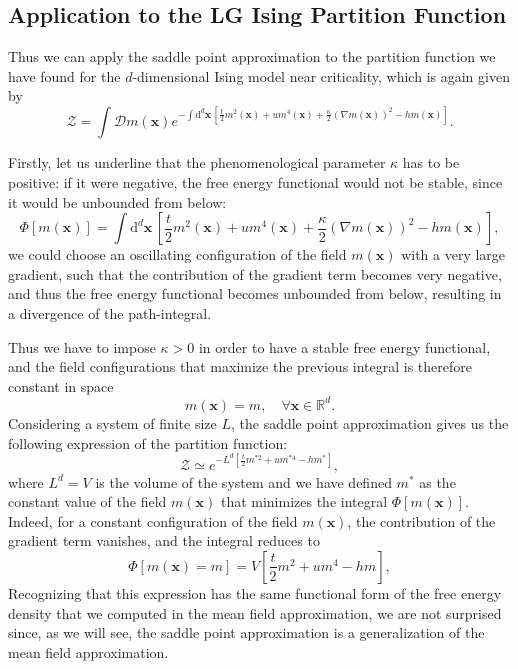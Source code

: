 \subsection{Application to the LG Ising Partition Function}

Thus we can apply the saddle point approximation to the partition function we have found for the \(d\)-dimensional Ising model near criticality, which is again given by
\[
    \mathcal{Z} = \int \mathcal{D} m(\mathbf{x}) e^{-\int \mathrm{d}^d \mathbf{x}\, \left[ \frac{t}{2} m^2(\mathbf{x}) + u m^4(\mathbf{x}) + \frac{\kappa}{2} (\nabla m(\mathbf{x}))^2 - h m(\mathbf{x})\right]}.
\]

Firstly, let us underline that the phenomenological parameter \(\kappa\) has to be positive: if it were negative, the free energy functional would not be stable, since it would be unbounded from below:
\[
    \Phi[m(\mathbf{x})] = \int \mathrm{d}^d \mathbf{x}\, \left[ \frac{t}{2} m^2(\mathbf{x}) + u m^4(\mathbf{x}) + \frac{\kappa}{2} (\nabla m(\mathbf{x}))^2 - h m(\mathbf{x})\right],
\]
we could choose an oscillating configuration of the field \(m(\mathbf{x})\) with a very large gradient, such that the contribution of the gradient term becomes very negative, and thus the free energy functional becomes unbounded from below, resulting in a divergence of the path-integral.

Thus we have to impose \(\kappa > 0\) in order to have a stable free energy functional, and the field configurations that maximize the previous integral is therefore constant in space
\[
    m(\mathbf{x}) = m, \quad \forall \mathbf{x} \in \mathbb{R}^d.
\]
Considering a system of finite size \(L\), the saddle point approximation gives us the following expression of the partition function:
\[
    \mathcal{Z} \simeq e^{-L^d \left[ \frac{t}{2} m^{*2} + u m^{*4} - h m^*\right]},
\]
where \(L^d = V\) is the volume of the system and we have defined \(m^*\) as the constant value of the field \(m(\mathbf{x})\) that minimizes the integral \(\Phi[m(\mathbf{x})]\).
Indeed, for a constant configuration of the field \(m(\mathbf{x})\), the contribution of the gradient term vanishes, and the integral reduces to
\[
    \Phi[m(\mathbf{x})=m] = V \left[ \frac{t}{2} m^2 + u m^4 - h m\right],
\]
Recognizing that this expression has the same functional form of the free energy density that we computed in the mean field approximation, we are not surprised since, as we will see, the saddle point approximation is a generalization of the mean field approximation.

